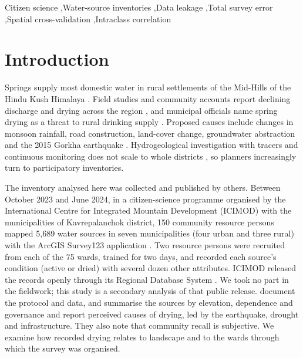 \documentclass[preprint,12pt,authoryear]{elsarticle}
\begin{document}
\begin{frontmatter}
\begin{keyword}
Citizen science \sep Water-source inventories \sep Data leakage \sep Total survey error \sep Spatial cross-validation \sep Intraclass correlation
\end{keyword}

\end{frontmatter}

\section{Introduction}\label{sec:intro}

Springs supply most domestic water in rural settlements of the Mid-Hills of the Hindu Kush Himalaya \citep{tambe2012reviving, icimod2021springs}. Field studies and community accounts report declining discharge and drying across the region \citep{poudel2017vanishing, pandit2024depleting}, and municipal officials name spring drying as a threat to rural drinking supply \citep{thapa2023drying}. Proposed causes include changes in monsoon rainfall, road construction, land-cover change, groundwater abstraction and the 2015 Gorkha earthquake \citep{chapagain2019status, chauhan2023degradation}. Hydrogeological investigation with tracers and continuous monitoring does not scale to whole districts \citep{thapa2023recharge}, so planners increasingly turn to participatory inventories.

The inventory analysed here was collected and published by others. Between October 2023 and June 2024, in a citizen-science programme organised by the International Centre for Integrated Mountain Development (ICIMOD) with the municipalities of Kavrepalanchok district, 150 community resource persons mapped 5,689 water sources in seven municipalities (four urban and three rural) with the ArcGIS Survey123 application \citep{thapa2025citizen}. Two resource persons were recruited from each of the 75 wards, trained for two days, and recorded each source's condition (active or dried) with several dozen other attributes. ICIMOD released the records openly through its Regional Database System \citep{icimod2025kavredata}. We took no part in the fieldwork; this study is a secondary analysis of that public release. \citet{thapa2025citizen} document the protocol and data, and \citet{pandit2026community} summarise the sources by elevation, dependence and governance and report perceived causes of drying, led by the earthquake, drought and infrastructure. They also note that community recall is subjective. We examine how recorded drying relates to landscape and to the wards through which the survey was organised.
\end{document}

